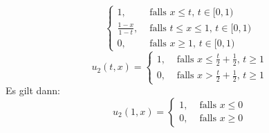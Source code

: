 \begin{bemerkung}
\[\begin{cases}
		1, &\text{ falls }x \leq t, \,t \in [0,1)\\
		\frac{1-x}{1-t} , &\text{ falls }t \leq x \leq 1, \, t \in [0,1) \\
		0, &\text{ falls }x \geq  1, \,t \in [0,1)
		\end{cases}
\]
\[
	u_2(t,x) = \begin{cases}
		1, &\text{ falls }x \leq \frac{t}{2}+ \frac{1}{2}, \,t \geq 1\\
		0, &\text{ falls }x > \frac{t}{2} + \frac{1}{2}, \,t \geq 1
	\end{cases}
\]
Es gilt dann:
\[
	u_2(1,x) = \begin{cases}
		1, &\text{ falls }x \leq 0\\
		0, &\text{ falls }x \geq 0
	\end{cases} 
\]
\end{bemerkung}